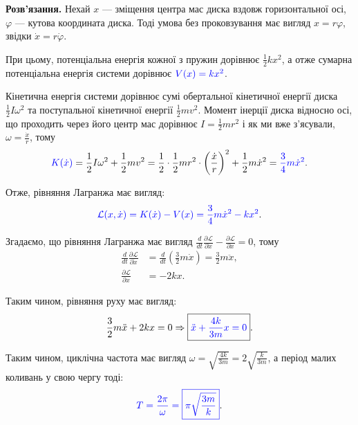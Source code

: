 \documentclass{hw_template}
\begin{document}
\textbf{Розв'язання.} Нехай $x$ --- зміщення центра мас диска вздовж 
горизонтальної осі, $\varphi$ --- кутова координата диска. Тоді умова 
без проковзування має вигляд $x = r\varphi$, звідки $\dot{x} = r\dot{\varphi}$.

При цьому, потенціальна енергія кожної з пружин дорівнює $\frac{1}{2}kx^2$, а
отже сумарна потенціальна енергія системи дорівнює $\textcolor{blue}{V(x) =
kx^2}$.

Кінетична енергія системи дорівнює сумі обертальної кінетичної енергії диска
$\frac{1}{2}I\omega^2$ та поступальної кінетичної енергії $\frac{1}{2}mv^2$. 
Момент інерції диска відносно осі, що проходить через його центр мас дорівнює
$I=\frac{1}{2}mr^2$ і як ми вже з'ясували, $\omega = \frac{\dot{x}}{r}$, тому
\begin{equation*}
    \textcolor{blue}{K(\dot{x})} = \frac{1}{2}I\omega^2 + \frac{1}{2}mv^2 = \frac{1}{2}\cdot\frac{1}{2}mr^2\cdot\left(\frac{\dot{x}}{r}\right)^2 + \frac{1}{2}m\dot{x}^2 = \textcolor{blue}{\frac{3}{4}m\dot{x}^2}.
\end{equation*}

Отже, рівняння Лагранжа має вигляд:
\begin{equation*}
    \textcolor{blue}{\mathcal{L}(x,\dot{x}) = K(\dot{x}) - V(x) = \frac{3}{4}m\dot{x}^2 - kx^2}.
\end{equation*}

Згадаємо, що рівняння Лагранжа має вигляд $\frac{d}{dt} \frac{\partial \mathcal{L}}{\partial \dot{x}} - \frac{\partial\mathcal{L}}{\partial x} = 0$, тому
\begin{align*}
    \frac{d}{dt} \frac{\partial \mathcal{L}}{\partial \dot{x}} &= \frac{d}{dt} \left(\frac{3}{2}m\dot{x}\right) = \frac{3}{2}m\ddot{x}, \\
    \frac{\partial \mathcal{L}}{\partial x} &= -2kx.
\end{align*}

Таким чином, рівняння руху має вигляд:
\begin{equation*}
    \frac{3}{2}m\ddot{x} + 2kx = 0 \Rightarrow \boxed{\textcolor{blue}{\ddot{x} + \frac{4k}{3m}x = 0}}.
\end{equation*}

Таким чином, циклічна частота має вигляд $\omega = \sqrt{\frac{4k}{3m}} =
2\sqrt{\frac{k}{3m}}$, а період малих коливань у свою чергу тоді:
\begin{equation*}
    \textcolor{blue}{T = \frac{2\pi}{\omega} = \boxed{\pi\sqrt{\frac{3m}{k}}}}.
\end{equation*}
\end{document}
